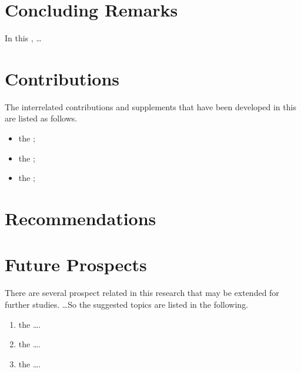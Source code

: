 \section{Concluding Remarks}

In this \documentType, \ldots

\section{Contributions}

The interrelated  contributions and supplements that have been developed in this \documentType are listed as follows.

\begin{itemize}
  \item the ; 
	
	\item the ; 
  
  \item the ; 
	
\end{itemize}


\section{Recommendations}

\Blindtext

\section{Future Prospects}

There are several prospect related in this research that may be extended for further studies. \ldots So the suggested topics are listed in the following.

\begin{enumerate}
	\item  the \ldots.
	
	\item  the \ldots.
		
	\item  the \ldots.
\end{enumerate}


